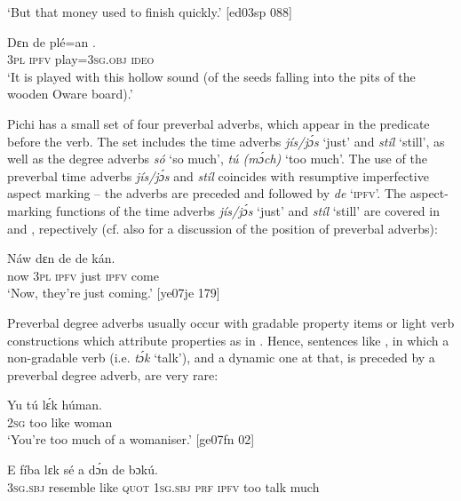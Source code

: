 \glt ‘But that money used to finish quickly.’ [ed03sp 088]
\z


\ea%
    \label{ex:key:857}
    \gll Dɛn  de  plé=an    .\\
\textsc{3pl}  \textsc{ipfv}  play=\textsc{3sg.obj}  \textsc{ideo}\\

\glt ‘It is played with this hollow sound (of the seeds 
falling into the pits of the wooden Oware board).’
\z

Pichi has a small set of four preverbal adverbs, which appear in the predicate before the verb. The set includes the time adverbs\textit{ jís}\textit{\textup{/}}\textit{jɔ́s} ‘just’ and \textit{stíl} ‘still’, as well as the degree adverbs \textit{só} ‘so much’, \textit{tú (mɔ́ch)} ‘too much’. The use of the preverbal time adverbs \textit{jís}\textit{\textup{/}}\textit{jɔ́s} and \textit{stíl} coincides with resumptive imperfective aspect marking – the adverbs are preceded and followed by \textit{de} ‘\textsc{ipfv}’. The aspect-marking functions of the time adverbs \textit{jís}\textit{\textup{/}}\textit{jɔ́s} ‘just’ and \textit{stíl} ‘still’ are covered in  and , repectively (cf. also for a discussion of the position of preverbal adverbs):


\ea%
    \label{ex:key:858}
    \gll Náw    dɛn  de    de  kán.\\
now    \textsc{3pl}  \textsc{ipfv}  just  \textsc{ipfv}  come\\

\glt ‘Now, they’re just coming.’ [ye07je 179]
\z

Preverbal degree adverbs usually occur with gradable property items or light verb constructions which attribute properties as in . Hence, sentences like , in which a non-gradable verb (i.e. \textit{tɔ́k} ‘talk’), and a dynamic one at that, is preceded by a preverbal degree adverb, are very rare: 


\ea%
    \label{ex:key:859}
    \gll Yu  tú  lɛ́k  húman.\\
\textsc{2sg}  too  like  woman\\

\glt ‘You’re too much of a womaniser.’ [ge07fn 02]
\z


\ea%
    \label{ex:key:860}
    \gll E    fíba    lɛk  sé    a    dɔ́n  de      bɔkú.\\
\textsc{3sg.sbj}  resemble  like  \textsc{quot}    \textsc{1sg.sbj}  \textsc{prf}  \textsc{ipfv}  too  talk  much\\

